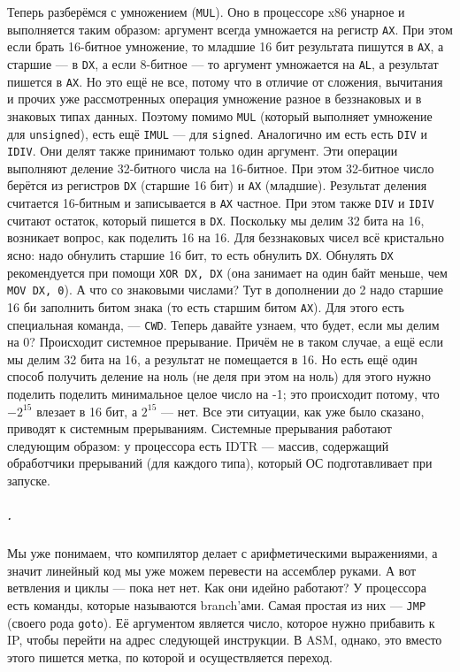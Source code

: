 \documentclass{article}
\newcommand{\asm}[1]{\texttt{#1}}
\begin{document}
    Теперь разберёмся с умножением (\asm{MUL}). Оно в процессоре x86 унарное и выполняется таким образом: аргумент всегда умножается на регистр \asm{AX}. При этом если брать 16-битное умножение, то младшие 16 бит результата пишутся в \asm{AX}, а старшие --- в \asm{DX}, а если 8-битное --- то аргумент умножается на \asm{AL}, а результат пишется в \asm{AX}. Но это ещё не все, потому что в отличие от сложения, вычитания и прочих уже рассмотренных операция умножение разное в беззнаковых и в знаковых типах данных. Поэтому помимо \asm{MUL} (который выполняет умножение для \texttt{unsigned}), есть ещё \asm{IMUL} --- для \texttt{signed}. Аналогично им есть есть \asm{DIV} и \asm{IDIV}. Они делят также принимают только один аргумент. Эти операции выполняют деление 32-битного числа на 16-битное. При этом 32-битное число берётся из регистров \asm{DX} (старшие 16 бит) и \asm{AX} (младшие). Результат деления считается 16-битным и записывается в \asm{AX} частное. При этом также \asm{DIV} и \asm{IDIV} считают остаток, который пишется в \asm{DX}. Поскольку мы делим 32 бита на 16, возникает вопрос, как поделить 16 на 16. Для беззнаковых чисел всё кристально ясно: надо обнулить старшие 16 бит, то есть обнулить \asm{DX}. Обнулять \asm{DX} рекомендуется при помощи \asm{XOR DX, DX} (она занимает на один байт меньше, чем \asm{MOV DX, 0}). А что со знаковыми числами? Тут в дополнении до 2 надо старшие 16 би заполнить битом знака (то есть старшим битом \asm{AX}). Для этого есть специальная команда, --- \asm{CWD}. Теперь давайте узнаем, что будет, если мы делим на 0? Происходит системное прерывание. Причём не в таком случае, а ещё если мы делим 32 бита на 16, а результат не помещается в 16. Но есть ещё один способ получить деление на ноль (не деля при этом на ноль) для этого нужно поделить поделить минимальное целое число на -1; это происходит потому, что $-2^{15}$ влезает в 16 бит, а $2^{15}$ --- нет. Все эти ситуации, как уже было сказано, приводят к системным прерываниям. Системные прерывания работают следующим образом: у процессора есть IDTR --- массив, содержащий обработчики прерываний (для каждого типа), который ОС подготавливает при запуске.
    \subparagraph{.}
    Мы уже понимаем, что компилятор делает с арифметическими выражениями, а значит линейный код мы уже можем перевести на ассемблер руками. А вот ветвления и циклы --- пока нет нет. Как они идейно работают? У процессора есть команды, которые называются branch'ами. Самая простая из них --- \asm{JMP} (своего рода \texttt{goto}). Её аргументом является число, которое нужно прибавить к IP, чтобы перейти на адрес следующей инструкции. В ASM, однако, это вместо этого пишется метка, по которой и осуществляется переход.\\
\end{document}
